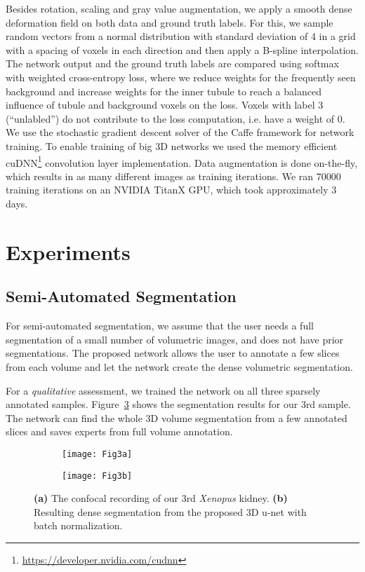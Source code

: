 \documentclass[runningheads,a4paper]{llncs}
\newcommand{\species}[1]{\textit{#1}}
\begin{document}
Besides rotation, scaling and gray value augmentation, we apply a smooth dense deformation field on both data and ground truth labels. For this, we sample random vectors from a normal distribution with standard deviation of 4 in a grid with a spacing of  voxels in each direction and then apply a B-spline interpolation. The network output and the ground truth labels are compared using softmax with weighted cross-entropy loss, where we reduce weights for the frequently seen background and increase weights for the inner tubule to reach a balanced influence of tubule and background voxels on the loss. Voxels with label 3 (``unlabled'') do not contribute to the loss computation, i.e. have a weight of 0. We use the stochastic gradient descent solver of the Caffe \cite{caffe} framework for network training. To enable training of big 3D networks we used the memory efficient cuDNN\footnote{\url{https://developer.nvidia.com/cudnn}} convolution layer implementation. Data augmentation is done on-the-fly, which results in as many different images as training iterations. We ran 70000 training iterations on an NVIDIA TitanX GPU, which took approximately 3 days.

\section{Experiments}

\subsection{Semi-Automated Segmentation}\label{subsec:general}

For semi-automated segmentation, we assume that the user needs a full segmentation of a small number of volumetric images, and does not have prior segmentations. The proposed network allows the user to annotate a few slices from each volume and let the network create the dense volumetric segmentation. 

For a \textit{qualitative} assessment, we trained the network on all three sparsely annotated samples. Figure~\ref{fig:gen} shows the segmentation results for our 3rd sample. The network can find the whole 3D volume segmentation from a few annotated slices and saves experts from full volume annotation.

\begin{figure}
\centering
\begin{subfigure}{.5\textwidth}
  \centering
  \texttt{[image: Fig3a]}
  \caption{}
  \label{fig:gen1}
\end{subfigure}\begin{subfigure}{.5\textwidth}
  \centering
  \texttt{[image: Fig3b]}
  \caption{}
  \label{fig:gen2}
\end{subfigure}
\caption{\textbf{(a)} The confocal recording of our 3rd \species{Xenopus} kidney. \textbf{(b)} Resulting dense segmentation from the proposed 3D u-net with batch normalization.}
\label{fig:gen}
\end{figure}
\end{document}

